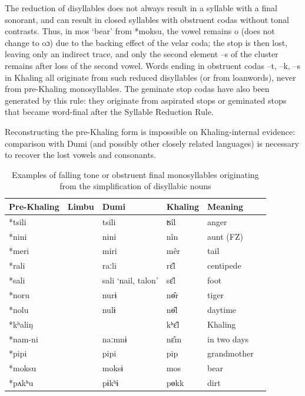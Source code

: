 \documentclass[oldfontcommands,oneside,a4paper,11pt]{article}
\newcommand{\ipa}[1]{{\phon \mbox{#1}}} %
\begin{document}
The reduction of disyllables does not always result in a syllable with a final sonorant, and can result in closed syllables with obstruent codas without tonal contrasts. Thus, in  \ipa{mos}	`bear' from \ipa{*moksu}, the vowel remains \ipa{o} (does not change to \ipa{oɔ}) due to the backing effect of the velar coda; the stop is then lost, leaving only an indirect trace, and only the second element \ipa{--s} of the cluster remains after loss of the second vowel. Words ending in obstruent codas \ipa{--t}, \ipa{--k}, \ipa{--s}   in Khaling all originate from such reduced disyllables (or from loanwords), never from pre-Khaling monosyllables. The geminate stop codas have also been generated by this rule: they originate from aspirated stops or geminated stops that  became word-final after the Syllable Reduction Rule.

Reconstructing the pre-Khaling form is impossible on Khaling-internal evidence: comparison with Dumi (and possibly other closely related languages) is necessary to recover the lost vowels and consonants.

\begin{table}[H]
\caption{Examples of falling tone or obstruent final  monosyllables originating from the simplification of   disyllabic nouns } \centering \label{tab:falling.reduction}
\begin{tabular}{llllll}
\toprule
Pre-Khaling	&Limbu	&Dumi	&Khaling	&Meaning\\
\midrule
\ipa{*tsili}			&&	\ipa{tsili}	&	\ipa{ʦîl}	&	anger\\
\ipa{*nini	}		&&	\ipa{nini}	&	\ipa{nîn}		&aunt (FZ)\\
\ipa{*meri}		&&		\ipa{miri}	&	\ipa{mêr}	&	tail\\
\ipa{*rali	}		&&	\ipa{raːli}	&	\ipa{rɛ̂l}		&centipede \\
\ipa{*sali	}		&&	\ipa{sali} `nail, talon'	&	\ipa{sɛ̂l}		&foot \\
\midrule
\ipa{*noru	}		&&	\ipa{nurɨ}	&	\ipa{nɵ̂r}		& tiger \\
\ipa{*nolu	}		&&	\ipa{nulɨ}	&	\ipa{nɵ̂l}		& daytime \\
\midrule
\ipa{*kʰaliŋ}				&&&	\ipa{kʰɛ‍̂l}	&	Khaling\\
\ipa{*nam-ni}	&&		\ipa{naːmnɨ	}&	\ipa{nɛ̂m}	&	in two days\\
\midrule
\ipa{*pipi} 	&   & \ipa{pipi}	&	\ipa{pip}		& grandmother \\
\ipa{*moksu} 	&   & \ipa{moksɨ}	&	\ipa{mos}		&bear \\
\ipa{*pʌkʰu} 	&   & \ipa{pɨkʰɨ}	&	\ipa{pɵkk}		& dirt \\
\bottomrule
\end{tabular}
\end{table}
\end{document}
